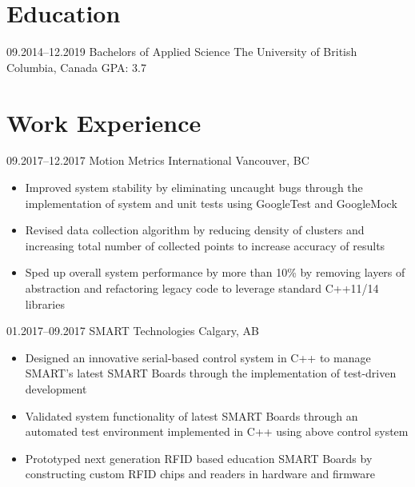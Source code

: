 \documentclass[]{cv-style}          %
\begin{document}
\section{Education}

\begin{entrylist}
\entry
{09.2014--12.2019}
{Bachelors {\normalfont of Applied Science}}
{The University of British Columbia, Canada}
{ {\hfill \normalfont GPA: 3.7}}
{\vspace{-0.3cm}}
\end{entrylist}


\section{Work Experience}

\begin{entrylist}
\entry
  {09.2017--12.2017}
  {Motion Metrics International}
  {Vancouver, BC}
  {
  \begin{itemize}[leftmargin=*]
    \item Improved system stability by eliminating uncaught bugs through the implementation of system and unit tests using GoogleTest and GoogleMock
    \item Revised data collection algorithm by reducing density of clusters and increasing total number of collected points to increase accuracy of results
    \item Sped up overall system performance by more than 10\% by removing layers of abstraction and refactoring legacy code to leverage standard C++11/14 libraries
  \end{itemize}}
\entry
  {01.2017--09.2017}
  {SMART Technologies}
  {Calgary, AB}
  {
  \begin{itemize}[leftmargin=*]
    \item Designed an innovative serial-based control system in C++ to manage SMART's latest SMART Boards through the implementation of test-driven development
    \item Validated system functionality of latest SMART Boards through an automated test environment implemented in C++ using above control system
    \item Prototyped next generation RFID based education SMART Boards by constructing custom RFID chips and readers in hardware and firmware
  \end{itemize}}

\end{entrylist}
\end{document}
